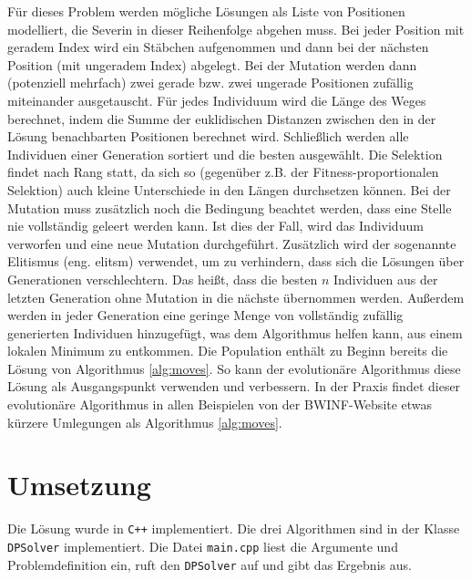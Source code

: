 \documentclass[a4paper,10pt,ngerman]{scrartcl}
\begin{document}
Für dieses Problem werden mögliche Lösungen als Liste von Positionen modelliert, die Severin in dieser Reihenfolge abgehen muss. 
Bei jeder Position mit geradem Index wird ein Stäbchen aufgenommen und dann bei der nächsten Position (mit ungeradem Index) abgelegt. 
Bei der Mutation werden dann (potenziell mehrfach) zwei gerade bzw. zwei ungerade Positionen zufällig miteinander ausgetauscht. 
Für jedes Individuum wird die Länge des Weges berechnet, indem die Summe der euklidischen Distanzen zwischen den in der Lösung benachbarten Positionen berechnet wird.
Schließlich werden alle Individuen einer Generation sortiert und die besten ausgewählt.
Die Selektion findet nach Rang statt, da sich so (gegenüber z.B. der Fitness-proportionalen Selektion) auch kleine Unterschiede in den Längen durchsetzen können. 
Bei der Mutation muss zusätzlich noch die Bedingung beachtet werden, dass eine Stelle nie vollständig geleert werden kann.
Ist dies der Fall, wird das Individuum verworfen und eine neue Mutation durchgeführt. 
Zusätzlich wird der sogenannte Elitismus (eng. elitsm) verwendet, um zu verhindern, dass sich die Lösungen über Generationen verschlechtern. 
Das heißt, dass die besten $n$ Individuen aus der letzten Generation ohne Mutation in die nächste übernommen werden. 
Außerdem werden in jeder Generation eine geringe Menge von vollständig zufällig generierten Individuen hinzugefügt, was dem Algorithmus helfen kann, aus einem lokalen Minimum zu entkommen. 
Die Population enthält zu Beginn bereits die Lösung von Algorithmus \ref{alg:moves}. So kann der evolutionäre Algorithmus diese Lösung als Ausgangspunkt verwenden und verbessern. 
In der Praxis findet dieser evolutionäre Algorithmus in allen Beispielen von der BWINF-Website etwas kürzere Umlegungen als Algorithmus \ref{alg:moves}.






\section{Umsetzung}
Die Lösung wurde in \texttt{C++} implementiert. Die drei Algorithmen sind in der Klasse \lstinline{DPSolver} implementiert. 
Die Datei \texttt{main.cpp} liest die Argumente und Problemdefinition ein, ruft den \lstinline{DPSolver} auf und gibt das Ergebnis aus. 
\end{document}
